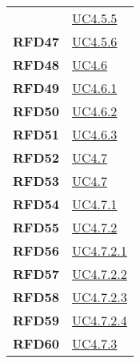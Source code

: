 \begin{longtable}[H]{>{\centering\bfseries}m{8cm} >{\centering\arraybackslash}m{8cm}}
    &  \hyperref[ssub:uc4.5.5]{UC4.5.5} \\

    RFD47
 
    &  \hyperref[ssub:uc4.5.6]{UC4.5.6} \\

    RFD48

    &   \hyperref[ssub:uc4.6.1]{UC4.6} \\

    RFD49
 
    &   \hyperref[par:uc4.6.1]{UC4.6.1} \\

    RFD50
  
    &   \hyperref[par:uc4.6.2]{UC4.6.2} \\

    RFD51
  
    &   \hyperref[par:uc4.6.3]{UC4.6.3} \\

    RFD52
  
    &   \hyperref[ssub:uc4.7]{UC4.7} \\

    RFD53

    &   \hyperref[ssub:uc4.7]{UC4.7} \\

    RFD54
 
    &   \hyperref[par:uc4.7.1]{UC4.7.1} \\

    RFD55

    &   \hyperref[par:uc4.7.2]{UC4.7.2} \\

    RFD56
  
    &   \hyperref[spar:uc4.7.2.1]{UC4.7.2.1} \\

    RFD57
 
    &   \hyperref[spar:uc4.7.2.2]{UC4.7.2.2} \\

    RFD58
 
    &   \hyperref[spar:uc4.7.2.3]{UC4.7.2.3} \\

    RFD59
 
    &   \hyperref[spar:uc4.7.2.4]{UC4.7.2.4} \\

    RFD60
  
    &   \hyperref[par:uc4.7.3]{UC4.7.3} \\


\end{longtable}
